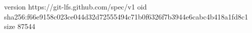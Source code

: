 version https://git-lfs.github.com/spec/v1
oid sha256:f66e9158c023ce044d32d72555494c71b0f6326f7b3944e6cabc4b418a1fd8c1
size 87544
